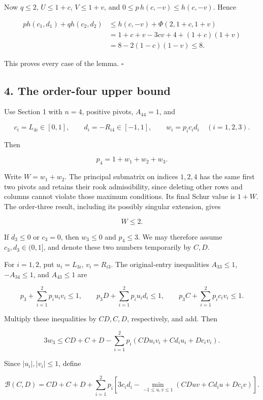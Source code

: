 \documentclass[10pt,a4paper]{article}
\begin{document}
Now \(q\le2\), \(U\le1+c\), \(V\le1+v\), and
\(0\le p\,h(c,-v)\le h(c,-v)\). Hence

\[
\begin{aligned}
p h(c_1,d_1)+q h(c_2,d_2)
&\le h(c,-v)+\Phi(2,1+c,1+v)\\
&=1+c+v-3cv+4+(1+c)(1+v)\\
&=8-2(1-c)(1-v)\le8.
\end{aligned}
\]

This proves every case of the lemma. \(\square\)

\subsection{4. The order-four upper
bound}\label{the-order-four-upper-bound}

Use Section 1 with \(n=4\), positive pivots, \(A_{44}=1\), and

\[
c_i=L_{4i}\in[0,1],\qquad d_i=-R_{i4}\in[-1,1],
\qquad w_i=p_i c_i d_i\quad(i=1,2,3).
\]

Then

\[
p_4=1+w_1+w_2+w_3.
\tag{10}
\]

Write \(W=w_1+w_2\). The principal submatrix on indices \(1,2,4\) has
the same first two pivots and retains their rook admissibility, since
deleting other rows and columns cannot violate those maximum conditions.
Its final Schur value is \(1+W\). The order-three result, including its
possibly singular extension, gives

\[
W\le2.
\tag{11}
\]

If \(d_3\le0\) or \(c_3=0\), then \(w_3\le0\) and \(p_4\le3\). We may
therefore assume \(c_3,d_3\in(0,1]\), and denote these two numbers
temporarily by \(C,D\).

For \(i=1,2\), put \(u_i=L_{3i}\), \(v_i=R_{i3}\). The original-entry
inequalities \(A_{33}\le1\), \(-A_{34}\le1\), and \(A_{43}\le1\) are

\[
p_3+\sum_{i=1}^2p_i u_i v_i\le1,
\qquad p_3D+\sum_{i=1}^2p_i u_i d_i\le1,
\qquad p_3C+\sum_{i=1}^2p_i c_i v_i\le1.
\]


Multiply these inequalities by \(CD,C,D\), respectively, and add. Then

\[
3w_3\le CD+C+D-
\sum_{i=1}^2p_i(CD u_iv_i+C d_i u_i+D c_i v_i).
\]

Since \(|u_i|,|v_i|\le1\), define

\[
\mathcal B(C,D)=CD+C+D+
\sum_{i=1}^2p_i\left[3c_id_i-
\min_{-1\le u,v\le1}(CDuv+C d_i u+D c_i v)\right].
\]
\end{document}
